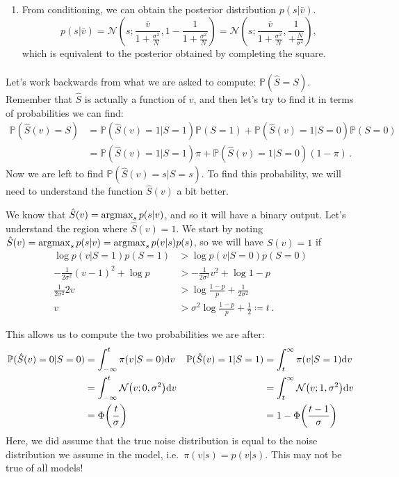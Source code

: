 \begin{enumerate}[label=\alph*.]
\item From conditioning, we can obtain the posterior distribution $p(s| \bar{v})$.
\begin{equation}
p(s| \bar{v}) = \mathcal{N}\left(s; \frac{\bar{v}}{1 + \frac{\sigma^2}{N}}, 1 - \frac{1}{1 + \frac{\sigma^2}{N}}\right) = \mathcal{N}\left(s; \frac{\bar{v}}{1 + \frac{\sigma^2}{N}}, \frac{1}{ + \frac{N}{\sigma^2}}\right),
\end{equation}
which is equivalent to the posterior obtained by completing the square.

\end{enumerate}



\paragraph{}
Let's work backwards from what we are asked to compute: $\mathbb{P}(\hat S = S)$. Remember that $\hat S$ is actually a function of $v$, and then let's try to find it in terms of probabilities we can find:
\begin{align}
\mathbb P(\hat S(v) = S) &= \mathbb P(\hat S(v) = 1|S=1)\mathbb P(S=1) + \mathbb P(\hat S(v) = 1|S=0)\mathbb P(S=0) \\
&=\mathbb P(\hat S(v) = 1|S=1) \pi + \mathbb P(\hat S(v) = 1|S=0) (1-\pi) \,.
\end{align}
Now we are left to find $\mathbb P(\hat S(v) = s|S=s)$. To find this probability, we will need to understand the function $\hat S(v)$ a bit better.

We know that $\hat S(v) = \operatorname*{\arg\!\max}_s p(s|v)$, and so it will have a binary output. Let's understand the region where $\hat S(v) = 1$. We start by noting $\hat S(v) = \operatorname*{\arg\!\max}_s p(s|v) = \operatorname*{\arg\!\max}_s p(v|s)p(s)$, so we will have $\hat S(v) = 1$ if
\begin{align}
\log p(v|S=1)p(S=1) &> \log p(v|S=0)p(S=0) \\
-\frac{1}{2\sigma^2}(v-1)^2 + \log p &> -\frac{1}{2\sigma^2}v^2 + \log 1-p \\
\frac{1}{2\sigma^2}2v &> \log \frac{1-p}{p} + \frac{1}{2\sigma^2} \\
v &> \sigma^2\log \frac{1-p}{p} + \frac{1}{2} \coloneqq t \,.
\end{align}

This allows us to compute the two probabilities we are after:
\begin{align}
\mathbb P(\hat S(v) = 0|S=0) &= \int_{-\infty}^t \pi(v|S=0)\calcd v &
\mathbb P(\hat S(v) = 1|S=1) &= \int_{t}^\infty \pi(v|S=1)\calcd v \\
&= \int_{-\infty}^t \NormDist{v; 0, \sigma^2} \calcd v & &= \int_t^\infty \NormDist{v; 1, \sigma^2}\calcd v \\
&= \Phi\left(\frac{t}{\sigma}\right) & &= 1-\Phi\left(\frac{t-1}{\sigma}\right)
\end{align}
Here, we did assume that the true noise distribution is equal to the noise distribution we assume in the model, i.e.~$\pi(v|s) = p(v|s)$. This may not be true of all models!

